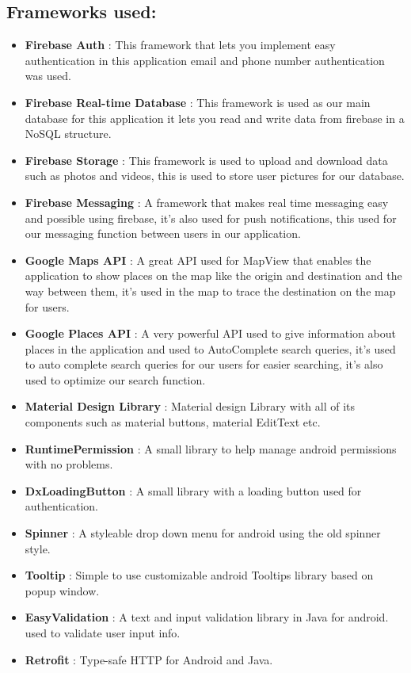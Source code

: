 \subsection{Frameworks used:}
\begin{itemize}
\item \textbf{Firebase Auth }: This framework that lets you implement easy authentication in this application email and phone number authentication was used.
\item \textbf{Firebase Real-time Database }: This framework is used as our main database for this application it lets you read and write data from firebase in a NoSQL structure. 
\item \textbf{Firebase Storage }: This framework is used to upload and download data such as photos and videos, this is used to store user pictures for our database.
\item \textbf{Firebase Messaging }: A framework that makes real time messaging easy and possible using firebase, it’s also used for push notifications, this used for our messaging function between users in our application. 
\item \textbf{ Google Maps API }: A great API used for MapView that enables the application to show places on the map like the origin and destination and the way between them, it’s used in the map to trace the destination on the map for users.
\item \textbf{Google Places API }: A very powerful API used to give information about places in the application and used to AutoComplete search queries, it’s used to auto complete search queries for our users for easier searching, it’s also used to optimize our search function.
\item \textbf{Material Design Library }: Material design Library with all of its components such as material buttons, material EditText etc.
\item \textbf{RuntimePermission }: A small library to help manage android permissions with no problems. 
\item \textbf{DxLoadingButton }: A small library with a loading button used for authentication. 
\item \textbf{Spinner }: A styleable drop down menu for android using the old spinner style. 
\item \textbf{Tooltip }: Simple to use customizable android Tooltips library based on popup window. 
\item \textbf{EasyValidation }: A text and input validation library in Java for android. used to validate user input info.
\item \textbf{Retrofit }: Type-safe HTTP for Android and Java.
\end{itemize}

